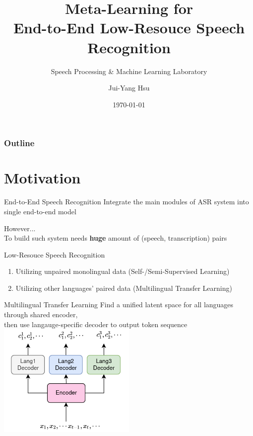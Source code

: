\documentclass{beamer}
\title{Meta-Learning for\\ End-to-End Low-Resouce Speech Recognition}
\subtitle{\textcolor[rgb]{0.00,0.50,1.00}{{Speech Processing \& Machine Learning Laboratory}}}
\author{Jui-Yang Hsu}
\date{\today}
\begin{document}
\begin{frame}
\maketitle
\end{frame}



\begin{frame}
\frametitle{Outline}
\tableofcontents
\end{frame}

\section{Motivation}
\begin{frame}{End-to-End Speech Recognition}
  Integrate the main modules of ASR system into single end-to-end model
  \vspace{2em}

  \pause

  However...\\
  To build such system needs \textbf{huge} amount of (speech, transcription) pairs
\end{frame}

\begin{frame}{Low-Resouce Speech Recognition}
  \begin{enumerate}
    \item Utilizing unpaired monolingual data (Self-/Semi-Supervised Learning)
    \item Utilizing other languages' paired data (Multilingual Transfer Learning)
  \end{enumerate}
\end{frame}

\begin{frame}{Multilingual Transfer Learning}
  Find a unified latent space for all languages through shared encoder, \\
  then use langauge-specific decoder to output token sequence
  \center \includegraphics[width=0.5\textwidth]{fig/MultiTaskASR.png}
\end{frame}
\end{document}
